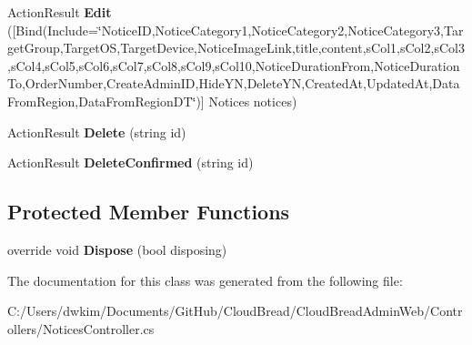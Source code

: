 \begin{DoxyCompactItemize}
\item 
Action\+Result {\bfseries Edit} (\mbox{[}Bind(Include=\char`\"{}Notice\+ID,Notice\+Category1,Notice\+Category2,Notice\+Category3,Target\+Group,Target\+OS,Target\+Device,Notice\+Image\+Link,title,content,s\+Col1,s\+Col2,s\+Col3,s\+Col4,s\+Col5,s\+Col6,s\+Col7,s\+Col8,s\+Col9,s\+Col10,Notice\+Duration\+From,Notice\+Duration\+To,Order\+Number,Create\+Admin\+ID,Hide\+YN,Delete\+YN,Created\+At,Updated\+At,Data\+From\+Region,Data\+From\+Region\+DT\char`\"{})\mbox{]} Notices notices)\hypertarget{a00169_ac2fb1f3b946ebacc7cdd78a293a6460f}{}\label{a00169_ac2fb1f3b946ebacc7cdd78a293a6460f}

\item 
Action\+Result {\bfseries Delete} (string id)\hypertarget{a00169_a3c38863679e9124ae1b9e91610ea79a9}{}\label{a00169_a3c38863679e9124ae1b9e91610ea79a9}

\item 
Action\+Result {\bfseries Delete\+Confirmed} (string id)\hypertarget{a00169_a7f9730eda286bfc73da208684c1128d0}{}\label{a00169_a7f9730eda286bfc73da208684c1128d0}

\end{DoxyCompactItemize}
\subsection*{Protected Member Functions}
\begin{DoxyCompactItemize}
\item 
override void {\bfseries Dispose} (bool disposing)\hypertarget{a00169_a99e5699b2799c3384ff56853e90f9296}{}\label{a00169_a99e5699b2799c3384ff56853e90f9296}

\end{DoxyCompactItemize}


The documentation for this class was generated from the following file\+:\begin{DoxyCompactItemize}
\item 
C\+:/\+Users/dwkim/\+Documents/\+Git\+Hub/\+Cloud\+Bread/\+Cloud\+Bread\+Admin\+Web/\+Controllers/Notices\+Controller.\+cs\end{DoxyCompactItemize}

